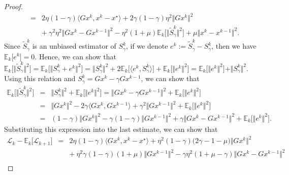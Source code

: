 \documentclass{article}
\newcommand{\norms}[1]{\Vert#1\Vert}
\newcommand{\iprods}[1]{\langle #1\rangle}
\newcommand{\Expsk}[2]{\mathbb{E}_{#1}\big[#2\big]}
\newcommand{\Lc}{\mathcal{L}}
\theoremstyle{plain}
\theoremstyle{definition}
\theoremstyle{remark}
\begin{document}
\begin{proof}
\begin{equation*}
\begin{array}{lcl}
& = & 2\eta( 1 - \gamma ) \iprods{Gx^k, x^k - x^{\star}} + 2\gamma(1-\gamma)\eta^2 \norms{Gx^k}^2 \\
&& + {~} \gamma^2\eta^2 \norms{Gx^k - Gx^{k-1}}^2  -  \eta^2(1 + \mu)  \Expsk{k}{ \norms{\widetilde{S}^k_{\gamma}}^2 }  +  \mu \norms{x^k - x^{k-1}}^2.
\end{array}
\end{equation*}
Since $\widetilde{S}^k_{\gamma}$ is an unbiased estimator of $S^k_{\gamma}$, if we denote $e^k := \widetilde{S}^k_{\gamma} - S^k_{\gamma}$, then we have $\Expsk{k}{e^k} = 0$.
Hence, we can show that $\Expsk{k}{ \norms{\widetilde{S}^k_{\gamma} }^2 } = \Expsk{k}{ \norms{S^k_{\gamma} + e^k}^2 } = \norms{S^k_{\gamma} }^2 + 2 \Expsk{k}{\iprods{e^k, S^k_{\gamma} }} + \Expsk{k}{ \norms{e^k}^2 } = \Expsk{k}{ \norms{e^k}^2 } + \norms{S^k_{\gamma} }^2$.
Using this relation and $S^k_{\gamma} = Gx^k - \gamma Gx^{k-1}$, we can show that
\begin{equation*}
\begin{array}{lcl}
\Expsk{k}{ \norms{\widetilde{S}^k_{\gamma} }^2 } &= & \norms{S^k_{\gamma} }^2 + \Expsk{k}{ \norms{e^k}^2 }  = \norms{Gx^k  - \gamma Gx^{k-1}}^2 + \Expsk{k}{ \norms{e^k}^2 } \\
&= & \norms{Gx^k}^2 - 2\gamma \iprods{Gx^k, Gx^{k-1}} + \gamma^2\norms{Gx^{k-1}}^2 + \Expsk{k}{ \norms{e^k}^2 } \\
& = & (1-\gamma)\norms{Gx^k}^2 - \gamma(1-\gamma)\norms{Gx^{k-1}}^2 + \gamma\norms{Gx^k - Gx^{k-1}}^2 + \Expsk{k}{ \norms{e^k}^2 }.
\end{array}
\end{equation*}
Substituting this expression into the last estimate, we can show that
\begin{equation*} 
\begin{array}{lcl}
\Lc_k - \Expsk{k}{ \Lc_{k+1} }
& = &  2\eta(1-\gamma)  \iprods{Gx^k, x^k - x^{\star}} + \eta^2(1 - \gamma) \big(2\gamma - 1 -\mu \big)  \norms{Gx^k}^2 \\
&& + {~} \eta^2\gamma(1-\gamma)(1+\mu)  \norms{Gx^{k-1}}^2 -  \gamma \eta^2( 1 +  \mu - \gamma) \norms{Gx^k - Gx^{k-1}}^2  \\

\end{array}
\end{equation*}
\end{proof}
\end{document}
